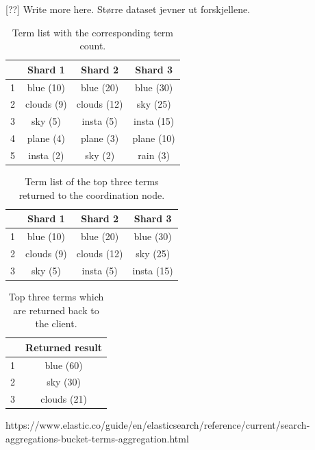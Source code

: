 [??] Write more here. Større dataset jevner ut forskjellene.


\begin{table}[h!]
    \centering
    \begin{tabular}{|l|c|c|c|}
    \hline
    ~ & \textbf{Shard 1}    & \textbf{Shard 2}     & \textbf{Shard 3}    \\ \hline
    1 & blue (10)  & blue (20)   & blue (30)  \\ \hline
    2 & clouds (9) & clouds (12) & sky (25)   \\ \hline
    3 & sky (5)    & insta (5)   & insta (15) \\ \hline
    4 & plane (4)  & plane (3)   & plane (10) \\ \hline
    5 & insta (2)  & sky (2)     & rain (3)   \\ \hline
    \end{tabular}
    \caption{Term list with the corresponding term count.}
    \label{tbl:shard-term-counts}
\end{table}

\begin{table}[h!]
    \centering
    \begin{tabular}{|l|c|c|c|}
    \hline
    ~ & \textbf{Shard 1}    & \textbf{Shard 2}     & \textbf{Shard 3}    \\ \hline
    1 & blue (10)  & blue (20)   & blue (30)  \\ \hline
    2 & clouds (9) & clouds (12) & sky (25)   \\ \hline
    3 & sky (5)    & insta (5)   & insta (15) \\ \hline
    \end{tabular}
    \caption{Term list of the top three terms returned to the coordination node.}
    \label{tbl:shard-top}
\end{table}

\begin{table}[h!]
    \centering
    \begin{tabular}{|l|c|}
    \hline
    ~ & \textbf{Returned result} \\ \hline
    1 & blue (60)     \\ \hline
    2 & sky (30)    \\ \hline
    3 & clouds (21)       \\ \hline
    \end{tabular}
    \caption{Top three terms which are returned back to the client.}
    \label{tbl:final-result}
\end{table}

https://www.elastic.co/guide/en/elasticsearch/reference/current/search-aggregations-bucket-terms-aggregation.html

